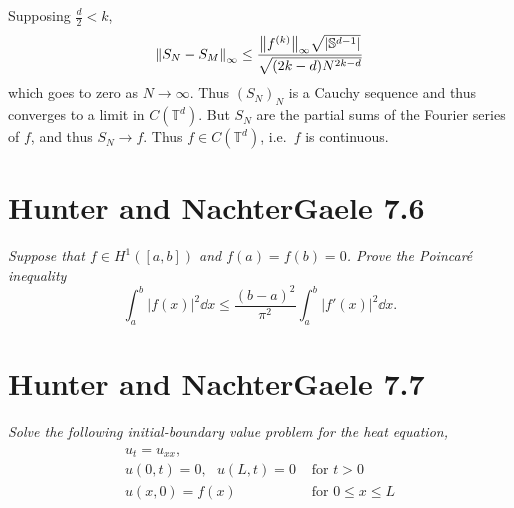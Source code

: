 \documentclass[12pt]{article}
\theoremstyle{plain}
\begin{document}
Supposing $\frac{d}{2} < k$,
\begin{align*}
    \norm{S_N - S_M}_\infty \leq \frac{\norm{f^{(k)}}_\infty\sqrt{|\mathbb{S}^{d-1}|}}{\sqrt{(2k-d)N^{2k-d}}}
\end{align*}
which goes to zero as $N \rightarrow \infty$.  Thus $(S_N)_N$ is a Cauchy sequence and thus converges to a limit in $C(\mathbb{T}^d)$.  But $S_N$ are the partial sums of the Fourier series of $f$, and thus $S_N \rightarrow f$.  Thus $f \in C(\mathbb{T}^d)$, i.e.~$f$ is continuous.

\section*{Hunter and NachterGaele 7.6}
\emph{Suppose that $f \in H^1([a,b])$ and $f(a) = f(b) = 0$.  Prove the \emph{Poincar\'{e} inequality} $$\int_a^b|f(x)|^2 \dd x \leq \frac{(b-a)^2}{\pi^2}\int_a^b|f'(x)|^2 \dd x.$$}

\section*{Hunter and NachterGaele 7.7}
\emph{Solve the following initial-boundary value problem for the heat equation,}
\begin{align*}
    \begin{array}{ll}
    u_t = u_{xx}, & \\
    u(0, t) = 0,\ \ \ u(L,t) = 0 & \text{ for } t > 0 \\
    u(x, 0) = f(x) & \text{ for } 0 \leq x \leq L
    \end{array}
\end{align*}
\end{document}
